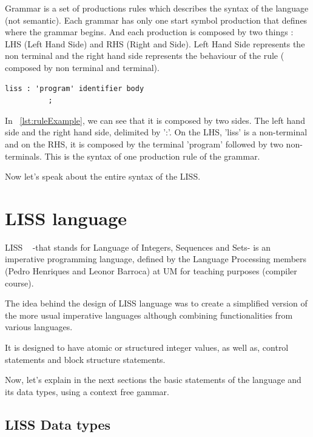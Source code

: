 \documentclass[
  oneside,
  11pt, a4paper,
  footinclude=true,
  headinclude=true,
  cleardoublepage=empty
]{scrbook}
\begin{document}
Grammar is a set of productions rules which describes the syntax of the language (not semantic). Each grammar has only one start symbol production that defines where the grammar begins.
And each production is composed by two things : LHS (Left Hand Side) and RHS (Right and Side). Left Hand Side represents the non terminal and the right hand side represents the behaviour of the rule ( composed by non terminal and terminal).

\begin{lstlisting}[caption={A rule production},label={lst:ruleExample}]
     liss : 'program' identifier body
          ;
\end{lstlisting}

In ~\ref{lst:ruleExample}, we can see that it is composed by two sides. The left hand side and the right hand side, delimited by ':'.
On the LHS, 'liss' is a non-terminal and on the RHS, it is composed by the terminal 'program' followed by two non-terminals.
This is the syntax of one production rule of the grammar.

Now let's speak about the entire syntax of the LISS.

\chapter{LISS language}

LISS ~\citep{CH07a} -that stands for Language of Integers, Sequences and Sets- is an imperative programming language, defined by the Language Processing members (Pedro Henriques and Leonor Barroca) at UM for teaching purposes (compiler course).

The idea behind the design of LISS language was to create a simplified version of the more usual imperative languages although combining functionalities from various languages.

It is designed to have atomic or structured integer values, as well as, control statements and block structure statements.

Now, let's explain in the next sections the basic statements of the language and its data types, using a context free gammar.

\section{LISS Data types}
\label{sec:data_types}
\end{document}
